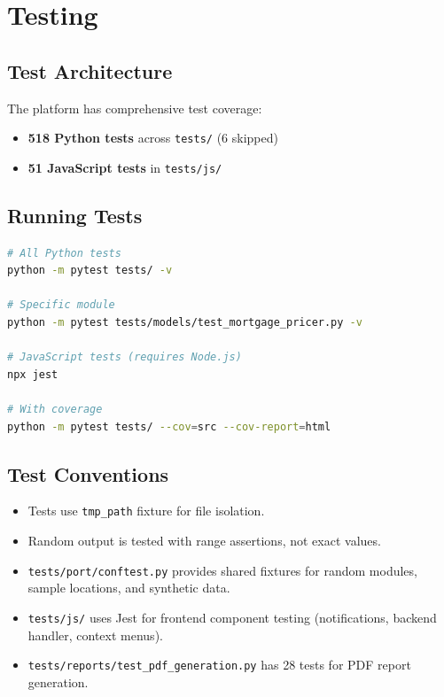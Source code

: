 \documentclass[11pt,a4paper]{article}
\begin{document}
\section{Testing}

\subsection{Test Architecture}

The platform has comprehensive test coverage:

\begin{itemize}[nosep]
    \item \textbf{518 Python tests} across \texttt{tests/} (6 skipped)
    \item \textbf{51 JavaScript tests} in \texttt{tests/js/}
\end{itemize}

\subsection{Running Tests}

\begin{lstlisting}[language=bash,caption={Test execution}]
# All Python tests
python -m pytest tests/ -v

# Specific module
python -m pytest tests/models/test_mortgage_pricer.py -v

# JavaScript tests (requires Node.js)
npx jest

# With coverage
python -m pytest tests/ --cov=src --cov-report=html
\end{lstlisting}

\subsection{Test Conventions}

\begin{itemize}[nosep]
    \item Tests use \texttt{tmp\_path} fixture for file isolation.
    \item Random output is tested with range assertions, not exact values.
    \item \texttt{tests/port/conftest.py} provides shared fixtures for random
          modules, sample locations, and synthetic data.
    \item \texttt{tests/js/} uses Jest for frontend component testing
          (notifications, backend handler, context menus).
    \item \texttt{tests/reports/test\_pdf\_generation.py} has 28 tests for PDF
          report generation.
\end{itemize}
\end{document}
